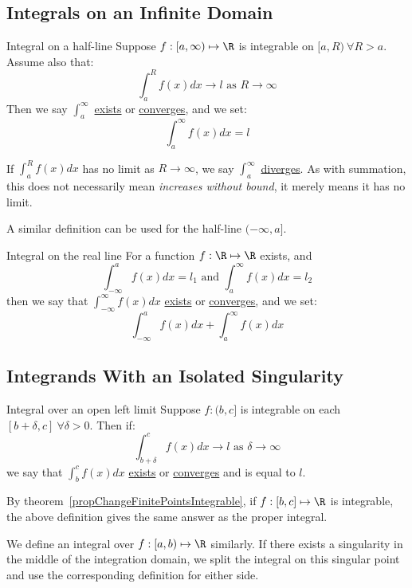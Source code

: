 \documentclass[../Main.tex]{subfiles}
\begin{document}
\subsection{Integrals on an Infinite Domain}
\begin{definition}{Integral on a half-line}
    Suppose $f : [a, \infty) \mapsto \R$ is integrable on $[a, R)~\forall R > a$. Assume also that:
    \begin{equation*}
        \int_a^R f(x) dx \to l \text{ as } R\to \infty
    \end{equation*}
    Then we say $\int_a^\infty$ \underline{exists} or \underline{converges}, and we set:
    \begin{equation*}
        \int_a^\infty f(x) dx = l
    \end{equation*}
\end{definition}
If $\int_a^R f(x) dx$ has no limit as $R \to \infty$, we say $\int_a^\infty$ \underline{diverges}. As with summation, this does not necessarily mean \textit{increases without bound}, it merely means it has no limit.

A similar definition can be used for the half-line $(-\infty, a]$.
\begin{definition}{Integral on the real line}
    For a function $f : \R \mapsto \R$ exists, and
    \begin{equation*}
        \int_{-\infty}^a f(x) dx = l_1 \text{ and } \int_a^\infty f(x) dx = l_2
    \end{equation*}
    then we say that $\int_{-\infty}^\infty f(x) dx$ \underline{exists} or \underline{converges}, and we set:
    \begin{equation*}
        \int_{-\infty}^a f(x) dx + \int_a^\infty f(x) dx
    \end{equation*}
\end{definition}
\subsection{Integrands With an Isolated Singularity}
\begin{definition}{Integral over an open left limit}
    Suppose $f : (b, c]$ is integrable on each $[b + \delta, c]~\forall \delta > 0$.
    Then if:
    \begin{equation*}
        \int_{b + \delta}^c f(x) dx \to l \text{ as } \delta \to \infty
    \end{equation*}
    we say that $\int_b^c f(x) dx$ \underline{exists} or \underline{converges} and is equal to $l$.
\end{definition}
\begin{remark}
    By theorem~\ref{propChangeFinitePointsIntegrable}, if $f : [b, c] \mapsto \R$ is integrable, the above definition gives the same answer as the proper integral.
\end{remark}
We define an integral over $f : [a, b) \mapsto \R$ similarly. If there exists a singularity in the middle of the integration domain, we split the integral on this singular point and use the corresponding definition for either side.
\end{document}
